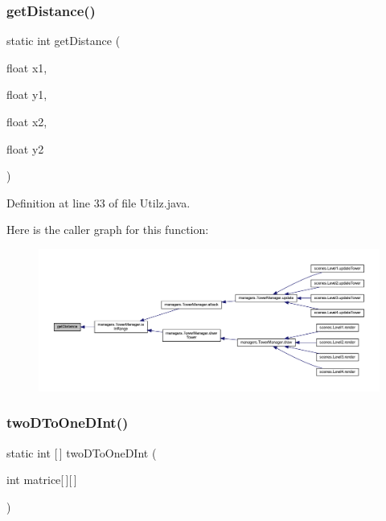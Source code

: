\subsubsection{\texorpdfstring{get\+Distance()}{getDistance()}}
{\footnotesize\ttfamily static int get\+Distance (\begin{DoxyParamCaption}\item[{float}]{x1,  }\item[{float}]{y1,  }\item[{float}]{x2,  }\item[{float}]{y2 }\end{DoxyParamCaption})\hspace{0.3cm}{\ttfamily [static]}}



Definition at line 33 of file Utilz.\+java.

Here is the caller graph for this function\+:
\nopagebreak
\begin{figure}[H]
\begin{center}
\leavevmode
\includegraphics[width=350pt]{classhelpz_1_1_utilz_a8a4c702547acd44cb113b787ae1d3e05_icgraph}
\end{center}
\end{figure}
\mbox{\label{classhelpz_1_1_utilz_a3a92fdb2e1e33fa3daadbdea23200fcc}} 
\subsubsection{\texorpdfstring{two\+D\+To\+One\+D\+Int()}{twoDToOneDInt()}}
{\footnotesize\ttfamily static int \mbox{[}$\,$\mbox{]} two\+D\+To\+One\+D\+Int (\begin{DoxyParamCaption}\item[{int}]{matrice\mbox{[}$\,$\mbox{]}\mbox{[}$\,$\mbox{]} }\end{DoxyParamCaption})\hspace{0.3cm}{\ttfamily [static]}}



